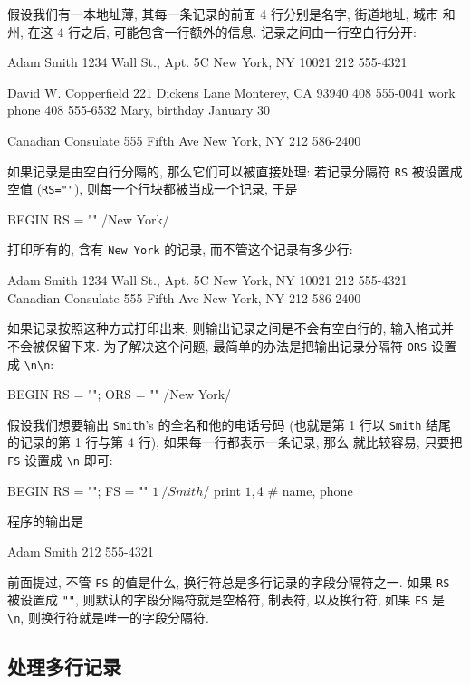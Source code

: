 \begin{shell}
假设我们有一本地址薄, 其每一条记录的前面 4 行分别是名字, 街道地址, 城市
和州, 在这 4 行之后, 可能包含一行额外的信息. 记录之间由一行空白行分开:
\begin{shell}
    Adam Smith
    1234 Wall St., Apt. 5C
    New York, NY 10021
    212 555-4321

    David W. Copperfield
    221 Dickens Lane
    Monterey, CA 93940
    408 555-0041
    work phone 408 555-6532
    Mary, birthday January 30

    Canadian Consulate
    555 Fifth Ave
    New York, NY
    212 586-2400
\end{shell}

如果记录是由空白行分隔的, 那么它们可以被直接处理: 若记录分隔符 \verb'RS'
被设置成空值 (\verb'RS=""'), 则每一个行块都被当成一个记录, 于是 
\begin{awkcode}
    BEGIN { RS = "" }
    /New York/
\end{awkcode}
打印所有的, 含有 \verb'New York' 的记录, 而不管这个记录有多少行:
\begin{shell}
    Adam Smith
    1234 Wall St., Apt. 5C
    New York, NY 10021
    212 555-4321
    Canadian Consulate
    555 Fifth Ave
    New York, NY
    212 586-2400
\end{shell}
如果记录按照这种方式打印出来, 则输出记录之间是不会有空白行的, 输入格式并
不会被保留下来. 为了解决这个问题, 最简单的办法是把输出记录分隔符 \verb'ORS'
设置成 \verb'\n\n':
\begin{awkcode}
    BEGIN { RS = ""; ORS = "\n\n" }
    /New York/
\end{awkcode}

假设我们想要输出 \verb'Smith''s 的全名和他的电话号码 (也就是第 1 行以 
\verb'Smith' 结尾的记录的第 1 行与第 4 行), 如果每一行都表示一条记录, 那么 
就比较容易, 只要把 \verb'FS' 设置成 \verb'\n' 即可:
\begin{awkcode}
    BEGIN           { RS = ""; FS = "\n" }
    $1 ~ /Smith$/   { print $1, $4 } # name, phone
\end{awkcode}
程序的输出是 
\begin{shell}
    Adam Smith 212 555-4321
\end{shell}
前面提过, 不管 \verb'FS' 的值是什么, 换行符总是多行记录的字段分隔符之一.
如果 \verb'RS' 被设置成 \verb'""', 则默认的字段分隔符就是空格符, 制表符,
以及换行符, 如果 \verb'FS' 是 \verb'\n', 则换行符就是唯一的字段分隔符.

\subsection{处理多行记录}
\label{subsec:processing_multiline_records}


\end{shell}
